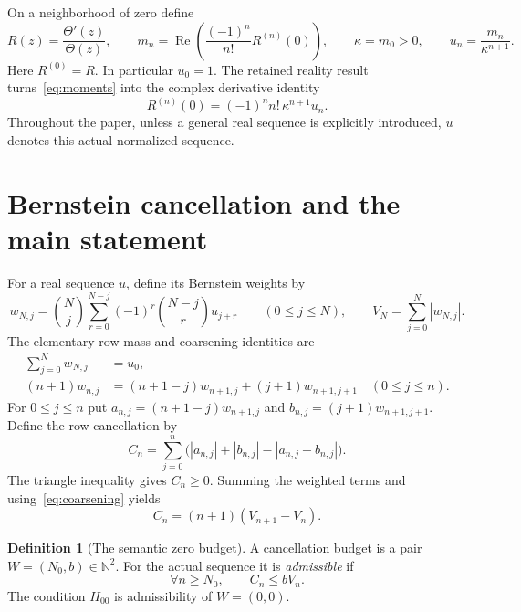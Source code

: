 \documentclass[11pt,a4paper]{article}
\theoremstyle{definition}
\newtheorem{definition}[theorem]{Definition}
\numberwithin{equation}{section}
\newcommand{\Ree}{\operatorname{Re}}
\begin{document}
On a neighborhood of zero define
\begin{equation}\label{eq:moments}
 R(z)=\frac{\Theta'(z)}{\Theta(z)},\qquad
 m_n=\Ree\!\left(\frac{(-1)^n}{n!}R^{(n)}(0)\right),\qquad
 \kappa=m_0>0,\qquad u_n=\frac{m_n}{\kappa^{n+1}}.
\end{equation}
Here $R^{(0)}=R$. In particular $u_0=1$. The retained reality result
turns~\eqref{eq:moments} into the complex derivative identity
\begin{equation}\label{eq:actual-derivatives}
 R^{(n)}(0)=(-1)^n n!\,\kappa^{n+1}u_n.
\end{equation}
Throughout the paper, unless a general real sequence is explicitly
introduced, $u$ denotes this actual normalized sequence.

\section{Bernstein cancellation and the main statement}\label{sec:cancel}
For a real sequence $u$, define its Bernstein weights by
\begin{equation}\label{eq:weights}
 w_{N,j}=\binom Nj\sum_{r=0}^{N-j}(-1)^r
                 \binom{N-j}{r}u_{j+r}\qquad(0\le j\le N),
 \qquad V_N=\sum_{j=0}^N|w_{N,j}|.
\end{equation}
The elementary row-mass and coarsening identities are
\begin{align}
 \sum_{j=0}^N w_{N,j}&=u_0,\label{eq:row-mass}\\
 (n+1)w_{n,j}
   &=(n+1-j)w_{n+1,j}+(j+1)w_{n+1,j+1}
       \quad(0\le j\le n).\label{eq:coarsening}
\end{align}
For $0\le j\le n$ put
$a_{n,j}=(n+1-j)w_{n+1,j}$ and
$b_{n,j}=(j+1)w_{n+1,j+1}$. Define the row cancellation by
\begin{equation}\label{eq:cancellation}
 C_n=\sum_{j=0}^n
 \bigl(|a_{n,j}|+|b_{n,j}|-|a_{n,j}+b_{n,j}|\bigr).
\end{equation}
The triangle inequality gives $C_n\ge0$. Summing the weighted terms and
using~\eqref{eq:coarsening} yields
\begin{equation}\label{eq:variation-increment}
 C_n=(n+1)(V_{n+1}-V_n).
\end{equation}

\begin{definition}[The semantic zero budget]
A cancellation budget is a pair $W=(N_0,b)\in\mathbb N^2$.
For the actual sequence it is \emph{admissible} if
\[
 \forall n\ge N_0,\qquad C_n\le bV_n.
\]
The condition $H_{00}$ is admissibility of $W=(0,0)$.
\end{definition}
\end{document}
